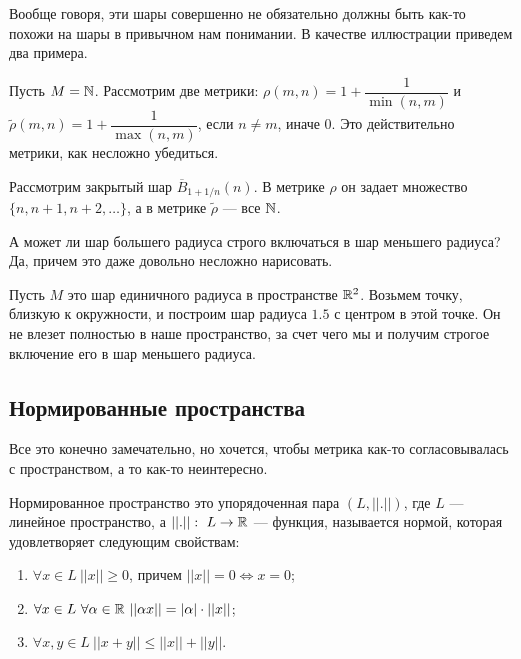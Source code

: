Вообще говоря, эти шары совершенно не обязательно должны быть как-то похожи на шары в привычном нам понимании. В качестве иллюстрации приведем два примера.
\begin{Examples}
Пусть $M = \mathbb{N}$. Рассмотрим две метрики: $\rho(m, n) = 1 + \dfrac{1}{\min(n, m)}$ и $\widetilde{\rho}(m, n) = 1 + \dfrac{1}{\max(n, m)}$, если $n \neq m$, иначе 0. Это действительно метрики, как несложно убедиться.

Рассмотрим закрытый шар $\overline{B}_{1 + 1/n}(n)$. В метрике $\rho$ он задает множество $\{n, n+1, n+2, \ldots\}$, а в метрике $\widetilde{\rho}$ --- все $\mathbb{N}$. 
\end{Examples}

\begin{Examples}
А может ли шар большего радиуса строго включаться в шар меньшего радиуса? Да, причем это даже довольно несложно нарисовать.

Пусть $M$ это шар единичного радиуса в пространстве $\mathbb{R}^2$. Возьмем точку, близкую к окружности, и построим шар радиуса $1.5$ с центром в этой точке. Он не влезет полностью в наше пространство, за счет чего мы и получим строгое включение его в шар меньшего радиуса.


\end{Examples}

\subsection*{Нормированные пространства}
Все это конечно замечательно, но хочется, чтобы метрика как-то согласовывалась с пространством, а то как-то неинтересно.

\begin{Def}
Нормированное пространство это упорядоченная пара $(L, ||.||)$, где $L$ --- линейное пространство, а $||.||:\ L \to \mathbb{R}$ --- функция, называется нормой, которая удовлетворяет следующим свойствам:
\begin{enumerate}
\item $\forall x \in L\ ||x|| \geq 0$, причем $||x|| = 0 \Leftrightarrow x = 0$;
\item $\forall x \in L\ \forall \alpha \in \mathbb{R}\ ||\alpha x|| = |\alpha|\cdot ||x||$;
\item $\forall x, y \in L\ ||x + y|| \leq ||x|| + ||y||$.
\end{enumerate}
\end{Def}

